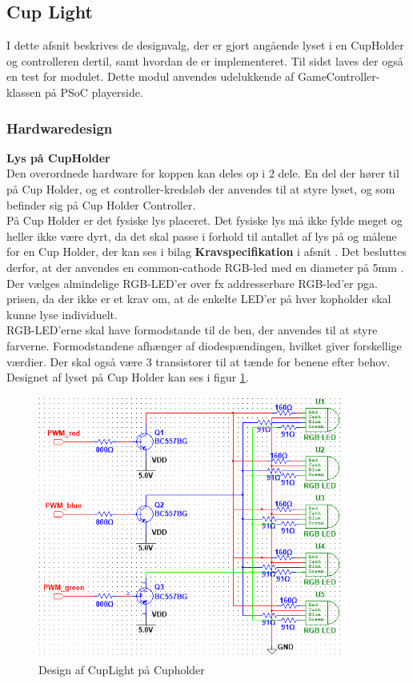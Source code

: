 \documentclass[Rapport/Rapport_main.tex]{subfiles}
\begin{document}
\subsection{Cup Light}\label{sec:rap_cup_light}
I dette afsnit beskrives de designvalg, der er gjort angående lyset i en CupHolder og controlleren dertil, samt hvordan de er implementeret. Til sidst laves der også en test for modulet. Dette modul anvendes udelukkende af GameController-klassen på PSoC playerside.
\subsubsection{Hardwaredesign}
\textbf{Lys på CupHolder}\\
Den overordnede hardware for koppen kan deles op i 2 dele. En del der hører til på Cup Holder, og et controller-kredsløb der anvendes til at styre lyset, og som befinder sig på Cup Holder Controller.\\
På Cup Holder er det fysiske lys placeret. Det fysiske lys må ikke fylde meget og heller ikke være dyrt, da det skal passe i forhold til antallet af lys på og målene for en Cup Holder, der kan ses i bilag \textbf{Kravspecifikation} i afsnit . Det besluttes derfor, at der anvendes en common-cathode RGB-led med en diameter på 5mm \cite{RGBledDatasheet}. Der vælges almindelige RGB-LED'er over fx addresserbare RGB-led'er pga. prisen, da der ikke er et krav om, at de enkelte LED'er på hver kopholder skal kunne lyse individuelt.\\
RGB-LED'erne skal have formodstande til de ben, der anvendes til at styre farverne. Formodstandene afhænger af diodespændingen, hvilket giver forskellige værdier. Der skal også være 3 transistorer\cite{datasheet_bc557b} til at tænde for benene efter behov. Designet af lyset på Cup Holder kan ses i figur \ref{fig:rap_cupholder_light}.
\begin{figure}[H]
    \centering
    \includegraphics[width=0.9\textwidth]{HardwareDesign/CupLight/graphics/CupHolder_HW.png}
    \caption{Design af CupLight på Cupholder}
    \label{fig:rap_cupholder_light}
\end{figure}
\end{document}
